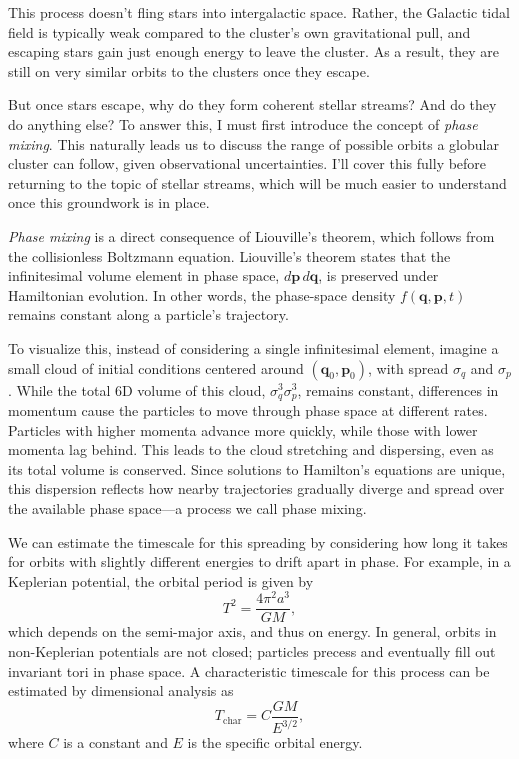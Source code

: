         This process doesn't fling stars into intergalactic space. Rather, the Galactic tidal field is typically weak compared to the cluster's own gravitational pull, and escaping stars gain just enough energy to leave the cluster. As a result, they are still on very similar orbits to the clusters once they escape.

        But once stars escape, why do they form coherent stellar streams? And do they do anything else? To answer this, I must first introduce the concept of \textit{phase mixing}. This naturally leads us to discuss the range of possible orbits a globular cluster can follow, given observational uncertainties. I'll cover this fully before returning to the topic of stellar streams, which will be much easier to understand once this groundwork is in place.
        
        \textit{Phase mixing} is a direct consequence of Liouville's theorem, which follows from the collisionless Boltzmann equation. Liouville's theorem states that the infinitesimal volume element in phase space, \( d\mathbf{p}\,d\mathbf{q} \), is preserved under Hamiltonian evolution. In other words, the phase-space density \( f(\mathbf{q}, \mathbf{p}, t) \) remains constant along a particle's trajectory.

        To visualize this, instead of considering a single infinitesimal element, imagine a small cloud of initial conditions centered around \((\mathbf{q}_0, \mathbf{p}_0)\), with spread \(\sigma_q\) and \(\sigma_p\). While the total 6D volume of this cloud, \(\sigma_q^3 \sigma_p^3\), remains constant, differences in momentum cause the particles to move through phase space at different rates. Particles with higher momenta advance more quickly, while those with lower momenta lag behind. This leads to the cloud stretching and dispersing, even as its total volume is conserved. Since solutions to Hamilton's equations are unique, this dispersion reflects how nearby trajectories gradually diverge and spread over the available phase space—a process we call phase mixing.

        We can estimate the timescale for this spreading by considering how long it takes for orbits with slightly different energies to drift apart in phase. For example, in a Keplerian potential, the orbital period is given by
        \begin{equation}
            T^2 = \frac{4\pi^2 a^3}{GM},
        \end{equation}
        which depends on the semi-major axis, and thus on energy. In general, orbits in non-Keplerian potentials are not closed; particles precess and eventually fill out invariant tori in phase space. A characteristic timescale for this process can be estimated by dimensional analysis as
        \begin{equation}
            T_\mathrm{char} = C \frac{GM}{E^{3/2}},
        \end{equation}
        where \(C\) is a constant and \(E\) is the specific orbital energy.


